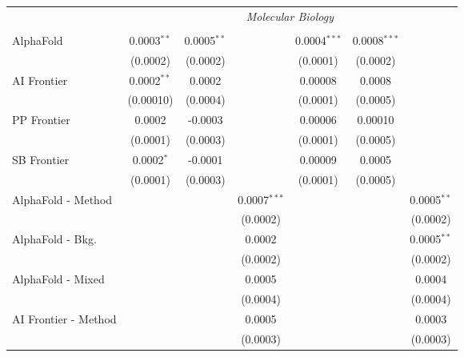 \begin{tabular}{lcccccc}
 & \multicolumn{6}{c}{\textit{Molecular Biology}} \\ \\
   AlphaFold            & 0.0003$^{**}$ & 0.0005$^{**}$ &                & 0.0004$^{***}$ & 0.0008$^{***}$ &   \\   
                        & (0.0002)      & (0.0002)      &                & (0.0001)       & (0.0002)       &   \\   
   AI Frontier          & 0.0002$^{**}$ & 0.0002        &                & 0.00008        & 0.0008         &   \\   
                        & (0.00010)     & (0.0004)      &                & (0.0001)       & (0.0005)       &   \\   
   PP Frontier          & 0.0002        & -0.0003       &                & 0.00006        & 0.00010        &   \\   
                        & (0.0001)      & (0.0003)      &                & (0.0001)       & (0.0005)       &   \\   
   SB Frontier          & 0.0002$^{*}$  & -0.0001       &                & 0.00009        & 0.0005         &   \\   
                        & (0.0001)      & (0.0003)      &                & (0.0001)       & (0.0005)       &   \\   
   AlphaFold - Method   &               &               & 0.0007$^{***}$ &                &                & 0.0005$^{**}$\\   
                        &               &               & (0.0002)       &                &                & (0.0002)\\   
   AlphaFold - Bkg.     &               &               & 0.0002         &                &                & 0.0005$^{**}$\\   
                        &               &               & (0.0002)       &                &                & (0.0002)\\   
   AlphaFold - Mixed    &               &               & 0.0005         &                &                & 0.0004\\   
                        &               &               & (0.0004)       &                &                & (0.0004)\\   
   AI Frontier - Method &               &               & 0.0005         &                &                & 0.0003\\   
                        &               &               & (0.0003)       &                &                & (0.0003)\\   

\end{tabular}

